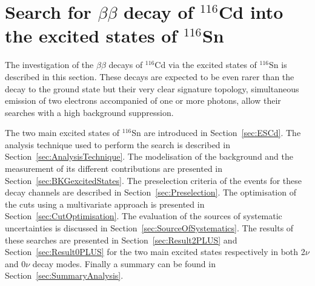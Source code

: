 \documentclass[main.tex]{subfiles}
\begin{document}
\chapter{Search for $\beta\beta$ decay of $^{\text{116}}$Cd into the excited states of $^{\text{116}}$Sn}








\NI The investigation of the $\beta\beta$ decays of $^{\text{116}}$Cd via the excited states of $^{\text{116}}$Sn is described in this section. These decays are expected to be even rarer than the decay to the ground state but their very clear signature topology, simultaneous emission of two electrons accompanied of one or more photons, allow their searches with a high background suppression.


\bigskip


\NI The two main excited states of $^{\text{116}}$Sn are introduced in Section~\ref{sec:ESCd}. The analysis technique used to perform the search is described in Section~\ref{sec:AnalysisTechnique}. The modelisation of the background and the measurement of its different contributions are presented in Section~\ref{sec:BKGexcitedStates}. The preselection criteria of the events for these decay channels are described in Section~\ref{sec:Preselection}. The optimisation of the cuts using a multivariate approach is presented in Section~\ref{sec:CutOptimisation}. The evaluation of the sources of systematic uncertainties is discussed in Section~\ref{sec:SourceOfSystematics}. The results of these searches are presented in Section~\ref{sec:Result2PLUS} and Section~\ref{sec:Result0PLUS} for the two main excited states respectively in both 2$\nu$ and 0$\nu$ decay modes. Finally a summary can be found in Section~\ref{sec:SummaryAnalysis}.




\end{document}
